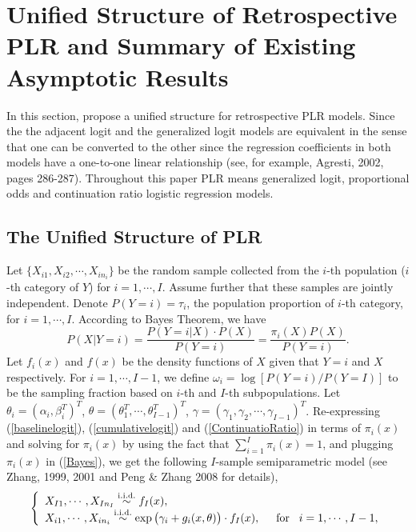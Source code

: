 \documentclass[11pt]{article}
\theoremstyle{plain}
\theoremstyle{definition}
\theoremstyle{remark}
\theoremstyle{definition}
\begin{document}
\section{Unified Structure of Retrospective PLR and Summary of Existing Asymptotic Results}\label{sec2}
In this section, propose a unified structure for retrospective PLR models. Since the the adjacent logit and the generalized logit models are equivalent in the sense that one can be converted to the other since the regression coefficients in both models have a one-to-one linear relationship (see, for example, Agresti, 2002, pages 286-287). Throughout this paper PLR means generalized logit, proportional odds and continuation ratio logistic regression models.
\subsection{The Unified Structure of PLR}
Let $\{X_{i1}, X_{i2}, \cdots, X_{in_i}\}$ be the random sample collected from the $i$-th population ($i$-th category of $Y$) for $ i = 1, \cdots, I $. Assume further that these samples are jointly independent. Denote $P(Y =i)=\tau_i$, the population proportion of $i$-th category,  for $i=1, \cdots, I$. According to Bayes Theorem, we have
\begin{equation}
P(X|Y =i)=\frac{P(Y =i|X) \cdot P(X)} {P(Y=i)}=\frac{\pi_i(X)P(X)}{P(Y=i)}. \label{Bayes}
\end{equation}
Let $f_i(x)$ and $f(x)$ be the density functions of $X$ given that $Y=i$ and $X$ respectively. For $i=1, \cdots, I-1$, we define $\omega_i=\log[P(Y=i)/P(Y=I)]$ to be the sampling fraction based on $i$-th and $I$-th subpopulations. Let $\theta_i=(\alpha_i,\beta_i^T)^T$, $\theta=(\theta_1^T, \cdots, \theta_{I-1}^T)^T$,
$\gamma=(\gamma_1, \gamma_2, \cdots, \gamma_{I-1})^T$. Re-expressing (\ref{baselinelogit}), (\ref{cumulativelogit}) and (\ref{ContinuatioRatio}) in terms of $\pi_i(x)$ and solving for $\pi_i(x)$ by using the fact that $\sum_{i=1}^I \pi_i(x)=1$, and plugging $\pi_i(x)$ in (\ref{Bayes}), we get the following $I$-sample semiparametric model (see Zhang, 1999, 2001 and Peng \& Zhang 2008 for details),
\begin{equation}
\left\{ \begin{array}{llll}
$$X_{I1}, \cdots, X_{In_I} \stackrel{\mathrm{ i.i.d.}}{\sim}f_{I}(x),\hspace{1.in}$$\\
$$X_{i1}, \cdots, X_{in_i} \stackrel{\mathrm{ i.i.d.}}
  {\sim} \exp\big(\gamma_i+g_i(x,\theta)\big)\cdot f_I(x),
  \hspace{5mm}\mbox{for}\hspace{3mm} i = 1, \cdots, I-1,$$
\end{array}\right.
\label{RetrospectivePLR}
\end{equation}
\end{document}
